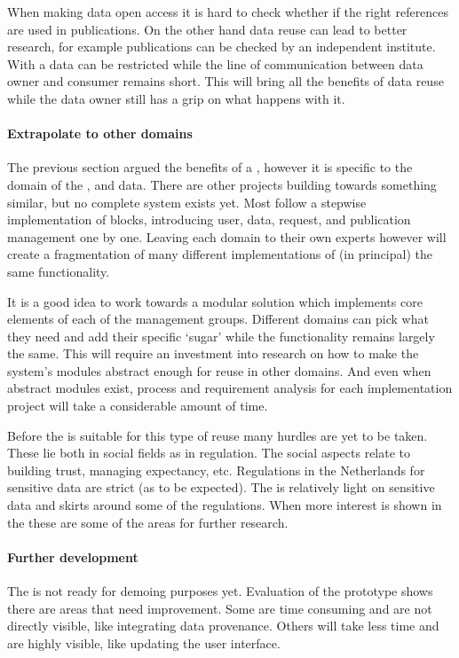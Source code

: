 When making data open access it is hard to check whether if the right references are used in publications.
On the other hand data reuse can lead to better research, for example publications can be checked by an independent institute.
With a \ivfsystem{} data can be restricted while the line of communication between data owner and consumer remains short.
This will bring all the benefits of data reuse while the data owner still has a grip on what happens with it.


\paragraph{Extrapolate to other domains}

The previous section argued the benefits of a \ivfsystem{}, however it is specific to the domain of the \projectdata{}, \ie{} \IVF{} and \PRN{} data.
There are other projects building towards something similar, but no complete system exists yet.
Most follow a stepwise implementation of blocks, introducing user, data, request, and publication management one by one.
Leaving each domain to their own experts however will create a fragmentation of many different implementations of (in principal) the same functionality.

It is a good idea to work towards a modular solution which implements core elements of each of the management groups.
Different domains can pick what they need and add their specific `sugar' while the functionality remains largely the same.
This will require an investment into research on how to make the system's modules abstract enough for reuse in other domains.
And even when abstract modules exist, process and requirement analysis for each implementation project will take a considerable amount of time.

Before the \ivfsystem{} is suitable for this type of reuse many hurdles are yet to be taken.
These lie both in social fields as in regulation.
The social aspects relate to building trust, managing expectancy, etc.
Regulations in the Netherlands for sensitive data are strict (as to be expected).
The \projectdata{} is relatively light on sensitive data and skirts around some of the regulations.
When more interest is shown in the \ivfsystem{} these are some of the areas for further research.

\paragraph{Further development}
The \ivfsystem{} is not ready for demoing purposes yet.
Evaluation of the prototype shows there are areas that need improvement.
Some are time consuming and are not directly visible, like integrating data provenance.
Others will take less time and are highly visible, like updating the user interface.


